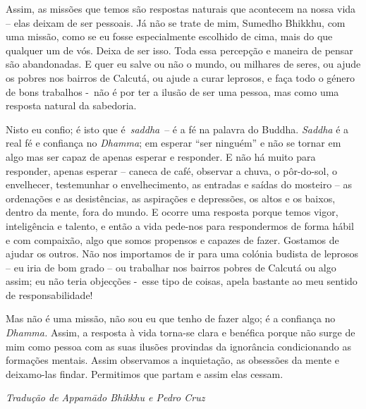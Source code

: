 Assim, as missões que temos são respostas naturais que acontecem na
nossa vida -- elas deixam de ser pessoais. Já não se trate de mim,
Sumedho Bhikkhu, com uma missão, como se eu fosse especialmente
escolhido de cima, mais do que qualquer um de vós. Deixa de ser isso.
Toda essa percepção e maneira de pensar são abandonadas. E quer eu salve
ou não o mundo, ou milhares de seres, ou ajude os pobres nos bairros de
Calcutá, ou ajude a curar leprosos, e faça todo o género de bons
trabalhos -~não é por ter a ilusão de ser uma pessoa, mas como uma
resposta natural da sabedoria.

Nisto eu confio; é isto que é~\emph{saddha}~-- é a fé na palavra do
Buddha. \emph{Saddha} é a real fé e confiança no \emph{Dhamma}; em
esperar ``ser ninguém'' e não se tornar em algo mas ser capaz de apenas
esperar e responder. E não há muito para responder, apenas esperar --
caneca de café, observar a chuva, o pôr-do-sol, o envelhecer,
testemunhar o envelhecimento, as entradas e saídas do mosteiro -- as
ordenações e as desistências, as aspirações e depressões, os altos e os
baixos, dentro da mente, fora do mundo. E ocorre uma resposta porque
temos vigor, inteligência e talento, e então a vida pede-nos para
respondermos de forma hábil e com compaixão, algo que somos propensos e
capazes de fazer. Gostamos de ajudar os outros. Não nos importamos de ir
para uma colónia budista de leprosos -- eu iria de bom grado -- ou
trabalhar nos bairros pobres de Calcutá ou algo assim; eu não teria
objecções -~esse tipo de coisas, apela bastante ao meu sentido de
responsabilidade!

Mas não é uma missão, não sou eu que tenho de fazer algo; é a confiança
no \emph{Dhamma.} Assim, a resposta à vida torna-se clara e benéfica
porque não surge de mim como pessoa com as suas ilusões provindas da
ignorância condicionando as formações mentais. Assim observamos a
inquietação, as obsessões da mente e deixamo-las findar. Permitimos que
partam e assim elas cessam.

\bigskip

{\raggedleft\itshape
  Tradução de Appamādo Bhikkhu e Pedro Cruz
\par}
